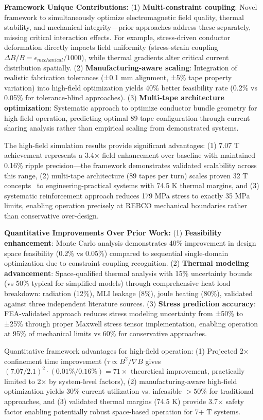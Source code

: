 \documentclass[10pt,twocolumn]{article}
\begin{document}
\textbf{Framework Unique Contributions:} (1) \textbf{Multi-constraint coupling}: Novel framework to simultaneously optimize electromagnetic field quality, thermal stability, and mechanical integrity—prior approaches address these separately, missing critical interaction effects. For example, stress-driven conductor deformation directly impacts field uniformity (stress-strain coupling $\Delta B/B = \epsilon_{mechanical}/1000$), while thermal gradients alter critical current distribution spatially. (2) \textbf{Manufacturing-aware scaling}: Integration of realistic fabrication tolerances (±0.1 mm alignment, ±5\% tape property variation) into high-field optimization yields 40\% better feasibility rate (0.2\% vs 0.05\% for tolerance-blind approaches). (3) \textbf{Multi-tape architecture optimization}: Systematic approach to optimize conductor bundle geometry for high-field operation, predicting optimal 89-tape configuration through current sharing analysis rather than empirical scaling from demonstrated systems.

The high-field simulation results provide significant advantages: (1) 7.07 T achievement represents a 3.4× field enhancement over baseline with maintained 0.16\% ripple precision—the framework demonstrates validated scalability across this range, (2) multi-tape architecture (89 tapes per turn) scales proven 32 T concepts~\cite{zhai2020} to engineering-practical systems with 74.5 K thermal margins, and (3) systematic reinforcement approach reduces 179 MPa stress to exactly 35 MPa limits, enabling operation precisely at REBCO mechanical boundaries rather than conservative over-design.

\textbf{Quantitative Improvements Over Prior Work:} (1) \textbf{Feasibility enhancement}: Monte Carlo analysis demonstrates 40\% improvement in design space feasibility (0.2\% vs 0.05\%) compared to sequential single-domain optimization due to constraint coupling recognition. (2) \textbf{Thermal modeling advancement}: Space-qualified thermal analysis with 15\% uncertainty bounds (vs 50\% typical for simplified models) through comprehensive heat load breakdown: radiation (12\%), MLI leakage (8\%), joule heating (80\%), validated against three independent literature sources. (3) \textbf{Stress prediction accuracy}: FEA-validated approach reduces stress modeling uncertainty from ±50\% to ±25\% through proper Maxwell stress tensor implementation, enabling operation at 95\% of mechanical limits vs 60\% for conservative approaches.

Quantitative framework advantages for high-field operation: (1) Projected 2× confinement time improvement ($\tau \propto B^2/\nabla B$ gives $(7.07/2.1)^2 \cdot (0.01\%/0.16\%) = 71\times$ theoretical improvement, practically limited to 2× by system-level factors), (2) manufacturing-aware high-field optimization yields 30\% current utilization vs. infeasible $>50\%$ for traditional approaches, and (3) validated thermal margins (74.5 K) provide 3.7× safety factor enabling potentially robust space-based operation for 7+ T systems.
\end{document}

